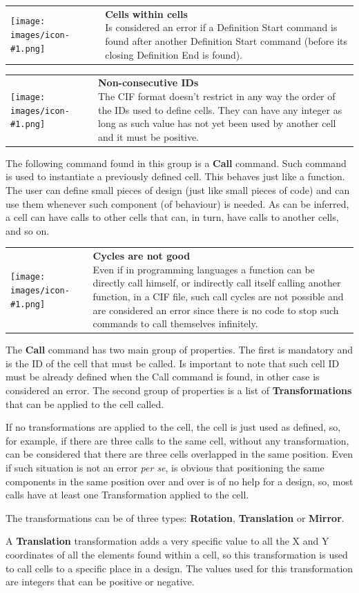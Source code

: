 \documentclass[11pt,twoside,openany,x11names,svgnames]{memoir}
\makeatletter
\newcommand{\IconNote}[3]
{
	\begin{table}[ht]
	\begin{tabular}{ lm{\dimexpr\textwidth-8\tabcolsep-\wd0}@{}}
		\toprule
		\texttt{[image: images/icon-\#1.png]}
		&
		\parbox[t]{155mm}{
		\textbf{#2} \\
		#3
		}
	\end{tabular}
\end{table}
}
\makeatother
\begin{document}
\IconNote
	{warning}
	{Cells within cells}
	{Is considered an error if a Definition Start command is found after another Definition Start command (before its closing Definition End is found).}
	
\IconNote
	{info}
	{Non-consecutive IDs}
	{The CIF format doesn't restrict in any way the order of the IDs used to define cells. They can have any integer as long as such value has not yet been used by another cell and it must be positive.}

The following command found in this group is a \textbf{Call} command. Such command is used to instantiate a previously defined cell. This behaves just like a function. The user can define small pieces of design (just like small pieces of code) and can use them whenever such component (of behaviour) is needed. As can be inferred, a cell can have calls to other cells that can, in turn, have calls to another cells, and so on.

\IconNote
	{warning}
	{Cycles are not good}
	{Even if in programming languages a function can be directly call himself, or indirectly call itself calling another function, in a CIF file, such call cycles are not possible and are considered an error since there is no code to stop such commands to call themselves infinitely.}
	
The \textbf{Call} command has two main group of properties. The first is mandatory and is the ID of the cell that must be called. Is important to note that such cell ID must be already defined when the Call command is found, in other case is considered an error. The second group of properties is a list of \textbf{Transformations} that can be applied to the cell called.

If no transformations are applied to the cell, the cell is just used as defined, so, for example, if there are three calls to the same cell, without any transformation, can be considered that there are three cells overlapped in the same position. Even if such situation is not an error \textit{per se}, is obvious that positioning the same components in the same position over and over is of no help for a design, so, most calls have at least one Transformation applied to the cell.

The transformations can be of three types: \textbf{Rotation}, \textbf{Translation} or \textbf{Mirror}.

A \textbf{Translation} transformation adds a very specific value to all the X and Y coordinates of all the elements found within a cell, so this transformation is used to call cells to a specific place in a design. The values used for this transformation are integers that can be positive or negative.
\end{document}
